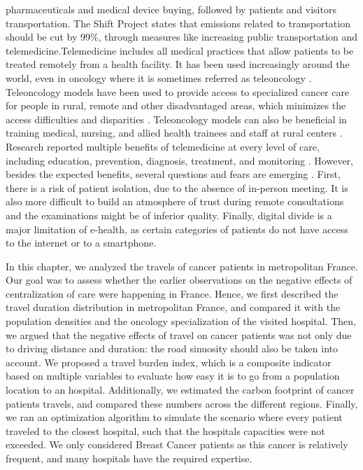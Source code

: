 pharmaceuticals and medical device buying, followed by patients and visitors
transportation. The Shift Project states that emissions related to
transportation should be cut by 99\%, through measures like increasing public
transportation and telemedicine.Telemedicine includes all medical practices that
allow patients to be treated remotely from a health facility. It has been used
increasingly around the world, even in oncology where it is sometimes referred
as teleoncology
\cite{mooi_teleoncology_2012,sabesan_are_2014,sabesan_timely_2014,sabesan_medical_2014}.
Teleoncology models have been used to provide access to specialized cancer care
for people in rural, remote and other disadvantaged areas, which minimizes the
access difficulties and disparities \cite{sabesan_telemedicine_2012,
    sabesan_are_2014}. Teleoncology models can also be beneficial in training
medical, nursing, and allied health trainees and staff at rural centers
\cite{sabesan_medical_2014}. Research reported multiple benefits of telemedicine
at every level of care, including education, prevention, diagnosis, treatment,
and monitoring \cite{bertucci_outpatient_2019}. However, besides the expected
benefits, several questions and fears are emerging
\cite{bertucci_outpatient_2019}. First, there is a risk of patient isolation,
due to the absence of in-person meeting. It is also more difficult to build an
atmosphere of trust during remote consultations and the examinations might be of
inferior quality. Finally, digital divide is a major limitation of e-health, as
certain categories of patients do not have access to the internet or to a
smartphone.

In this chapter, we analyzed the travels of cancer patients in metropolitan
France. Our goal was to assess whether the earlier observations on the negative
effects of centralization of care were happening in France. Hence, we first
described the travel duration distribution in metropolitan France, and compared
it with the population densities and the oncology specialization of the visited
hospital. Then, we argued that the negative effects of travel on cancer patients
was not only due to driving distance and duration: the road sinuosity should
also be taken into account. We proposed a travel burden index, which is a
composite indicator based on multiple variables to evaluate how easy it is to go
from a population location to an hospital. Additionally, we estimated the carbon
footprint of cancer patients travels, and compared these numbers across the
different regions. Finally, we ran an optimization algorithm to simulate the
scenario where every patient traveled to the closest hospital, such that the
hospitals capacities were not exceeded. We only considered Breast Cancer
patients as this cancer is relatively frequent, and many hospitals have the
required expertise.

